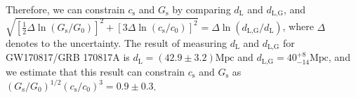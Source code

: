 \documentclass{article}
\begin{document}
Therefore, we can constrain $c_\text{s}$ and $G_\text{s}$ by comparing $d_\text{L}$ and $d_\text{L,G}$, and $\sqrt{[\frac{1}{2}\Delta\!\ln(G_\text{s}/G_0)]^2+[3\Delta\!\ln(c_\text{s}/c_0)]^2}=\Delta\!\ln(d_\text{L,G}/d_\text{L})$, where $\Delta$ denotes to the uncertainty. The result of measuring $d_\text{L}$ and $d_\text{L,G}$ for GW170817/GRB 170817A is $d_\text{L}=(42.9 \pm 3.2)\text{Mpc}$ and $d_\text{L,G}=40_{-14}^{+8}\text{Mpc}$, and we estimate that this result can constrain $c_\text{s}$ and $G_\text{s}$ as $(G_\text{s}/G_0)^{1/2}(c_\text{s}/c_0)^3=0.9 \pm 0.3$.
\end{document}

